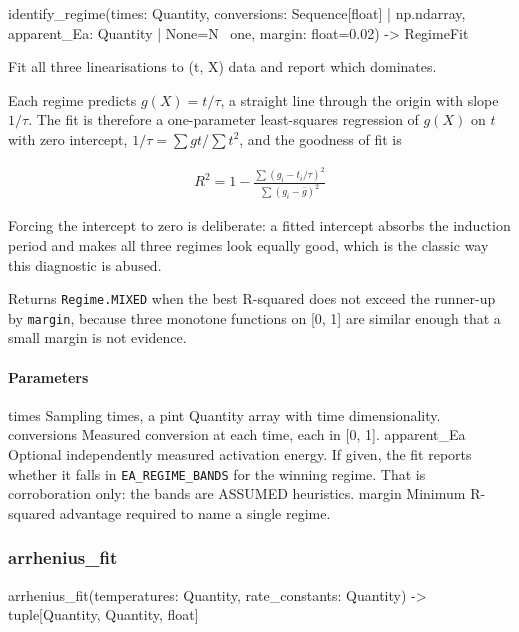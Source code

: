\documentclass[10pt,a4paper,twoside]{report}
\begin{document}
\begin{verbatimsmall}
identify_regime(times: Quantity, conversions: Sequence[float] | np.ndarray, apparent_Ea: Quantity | None=N
    \ one, margin: float=0.02) -> RegimeFit
\end{verbatimsmall}

Fit all three linearisations to (t, X) data and report which dominates.

Each regime predicts $g(X) = t/\tau$, a straight line through the origin with slope $1/\tau$. The fit is therefore a one-parameter least-squares regression of $g(X)$ on $t$ with zero intercept, $1/\tau = \sum g t / \sum t^2$, and the goodness of fit is

\begin{equation*}
\begin{gathered}
R^2 = 1 - \frac{\sum (g_i - t_i/\tau)^2}{\sum (g_i - \bar{g})^2}
\end{gathered}
\end{equation*}

Forcing the intercept to zero is deliberate: a fitted intercept absorbs the induction period and makes all three regimes look equally good, which is the classic way this diagnostic is abused.

Returns \texttt{Regime.MIXED} when the best R-squared does not exceed the runner-up by \texttt{margin}, because three monotone functions on [0, 1] are similar enough that a small margin is not evidence.

\paragraph*{Parameters}

times Sampling times, a pint Quantity array with time dimensionality. conversions Measured conversion at each time, each in [0, 1]. apparent\_Ea Optional independently measured activation energy. If given, the fit reports whether it falls in \texttt{EA\_REGIME\_BANDS} for the winning regime. That is corroboration only: the bands are ASSUMED heuristics. margin Minimum R-squared advantage required to name a single regime.

\subsubsection*{arrhenius\_fit}

\begin{verbatimsmall}
arrhenius_fit(temperatures: Quantity, rate_constants: Quantity) -> tuple[Quantity, Quantity, float]
\end{verbatimsmall}
\end{document}
